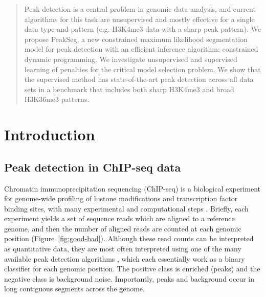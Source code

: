 \documentclass{article}
\begin{document}

\begin{abstract}
  Peak detection is a central problem in genomic data analysis, and
  current algorithms for this task are unsupervised and mostly
  effective for a single data type and pattern (e.g. H3K4me3 data with
  a sharp peak pattern). We propose PeakSeg, a new constrained maximum
  likelihood segmentation model for peak detection with an efficient
  inference algorithm: constrained dynamic programming. We investigate
  un\-super\-vised and super\-vised learning of penalties for
  the critical model selection problem. We show that the 
  super\-vised method has state-of-the-art peak
  detection across all data sets in a benchmark that includes both
  sharp H3K4me3 and broad H3K36me3 patterns.
\end{abstract}

\section{Introduction}

\subsection{Peak detection in ChIP-seq data}

Chromatin immunoprecipitation sequencing (ChIP-seq) is a biological
experiment for genome-wide profiling of histone modifications and
transcription factor binding sites, with many experimental and
computational steps \citep{practical}. Briefly, each experiment yields
a set of sequence reads which are aligned to a reference genome, and
then the number of aligned reads are counted at each genomic position
(Figure~\ref{fig:good-bad}). Although these read counts can be
interpreted as quantitative data, they are most often interpreted
using one of the many available peak detection algorithms
\citep{evaluation2010, rye2010manually, chip-seq-bench}, which each
essentially work as a binary classifier for each genomic position. The
positive class is enriched (peaks) and the negative class is
background noise. Importantly, peaks and background occur in long
contiguous segments across the genome.
\end{document}
